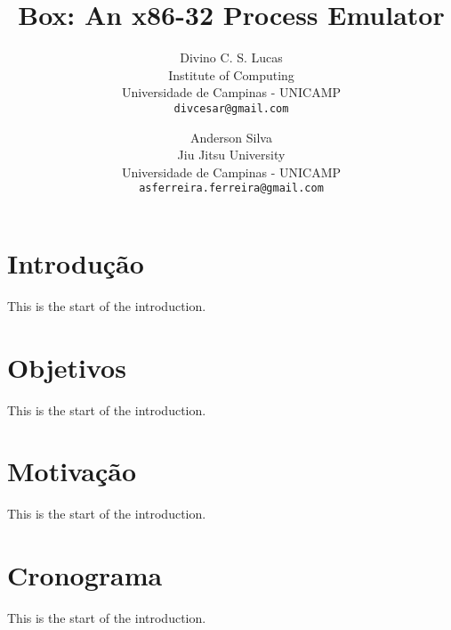 \documentclass[12pt]{article}
\title{Box: An x86-32 Process Emulator}
\author{Divino C. S. Lucas\\
\small Institute of Computing\\[-0.8ex]
\small Universidade de Campinas - UNICAMP\\
\small \texttt{divcesar@gmail.com}\\
\and
Anderson Silva\\
\small Jiu Jitsu University\\[-0.8ex]
\small Universidade de Campinas - UNICAMP\\
\small \texttt{asferreira.ferreira@gmail.com}
}
\begin{document}
\maketitle

\section{Introdução}

This is the start of the introduction.

\section{Objetivos}

This is the start of the introduction.

\section{Motivação}

This is the start of the introduction.

\section{Cronograma}

This is the start of the introduction.
\end{document}
